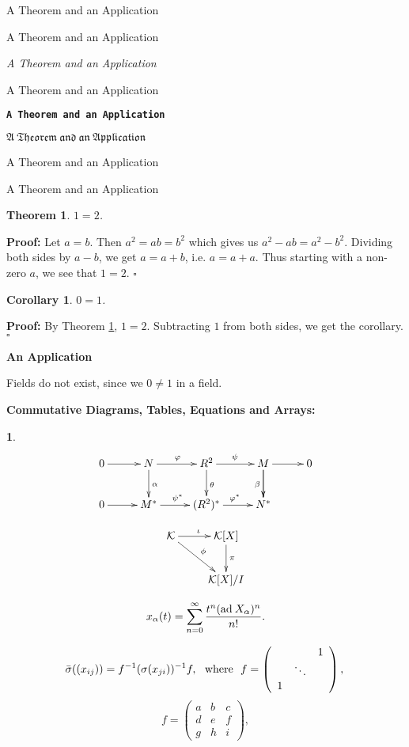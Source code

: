 \documentclass[12pt]{report}
\newtheorem{chunk}{}
\newtheorem{thm}[num]{{\bf Theorem}}
\newtheorem{cor}[num]{{\bf Corollary}}
\begin{document}
\centerline{\sc A Theorem and an Application}
\centerline{\rm A Theorem and an Application}
\centerline{\it A Theorem and an Application}
\centerline{\sf A Theorem and an Application}
\centerline{\bf \tt A Theorem and an Application}
\centerline { ${\mathfrak {A \ Theorem \ and \ an \ Application}}$} 
\centerline {\Large {A Theorem and an Application}} 
\centerline {\small {A Theorem and an Application}} 

\begin{thm}\label{T1}
$1 = 2$.
\end{thm}

\noindent
{\bf Proof:} Let $a = b$. Then $a^2 = ab = b^2$ which gives us $a^2 - ab = a^2 - b^2$. Dividing both sides by $a - b$, we get $a = a + b$, i.e. $a = a + a$. Thus starting with a non-zero $a$, we see that $1 = 2$. \hfill{$\square$}

\begin{cor}
$0 = 1$.
\end{cor}
{\bf Proof:} By Theorem \ref{T1}, $1 = 2$. Subtracting $1$ from both sides, we get the corollary.\hfill{$\square$}\\

\centerline{\bf An Application}
Fields do not exist, since we $0 \neq 1$ in a field.\\ 

\pagebreak

\noindent
{\bf Commutative Diagrams, Tables, Equations and Arrays:}
\begin{chunk}
\[
\xymatrixrowsep{1.8pc} \xymatrixcolsep{2.2pc}
\xymatrix{
0\ar@{->}[r]&
N\ar@{->}[r]^{\varphi}\ar@{->}[d]^{\alpha}&R^2\ar@{->}[d]^{\theta}\ar@{->}[r]^{\psi}&M\ar@{->}[d]_{\beta}\ar@{->}[d]\ar@{->}[r]&0\\
0\ar@{->}[r]&
M^*\ar@{->}[r]^{\psi^*}&(R^2)^*\ar@{->}[r]^{\varphi^*}&N^*&{}
}
\]
\end{chunk}

$$\xymatrix{\mathcal K \ar[r]^{\iota} \ar[rd]^\phi & \mathcal
K[X] \ar[d]^{\pi}\\ & \mathcal K[X]/I}$$



\begin{equation}\label{E:1}
x_{\alpha}(t) = \sum_{n = 0}^{\infty} 
\frac{t^n ({\rm ad}\: X_{\alpha})^n}{n!}.
\end{equation}

$$
\bar{\sigma}((x_{ij})) = f^{-1}(\sigma(x_{ji}))^{-1} f, \ \ 
{\rm where} \ \ 
f =\left( \begin{array}{ccc} 
\ & \ & 1 \\
\ & \ddots & \ \\
1 & \ & \ 
\end{array} \right), \\
$$
$$
f=\left( \begin{array}{ccc} 
a & b & c \\
d & e & f \\
g & h & i 
\end{array} \right), 
$$ 
 
\end{document}
